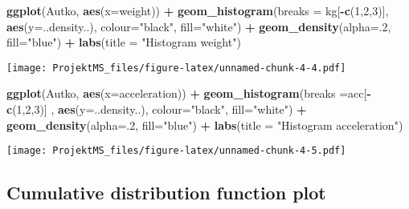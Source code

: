 \documentclass[
]{article}
\newenvironment{Shaded}{\begin{snugshade}}{\end{snugshade}}
\newcommand{\DataTypeTok}[1]{\textcolor[rgb]{0.13,0.29,0.53}{#1}}
\newcommand{\DecValTok}[1]{\textcolor[rgb]{0.00,0.00,0.81}{#1}}
\newcommand{\KeywordTok}[1]{\textcolor[rgb]{0.13,0.29,0.53}{\textbf{#1}}}
\newcommand{\NormalTok}[1]{#1}
\newcommand{\OperatorTok}[1]{\textcolor[rgb]{0.81,0.36,0.00}{\textbf{#1}}}
\newcommand{\StringTok}[1]{\textcolor[rgb]{0.31,0.60,0.02}{#1}}
\begin{document}
\begin{Shaded}
\begin{Highlighting}[]
\KeywordTok{ggplot}\NormalTok{(Autko, }\KeywordTok{aes}\NormalTok{(}\DataTypeTok{x=}\NormalTok{weight)) }\OperatorTok{+}\StringTok{ }\KeywordTok{geom_histogram}\NormalTok{(}\DataTypeTok{breaks =}\NormalTok{ kg[}\OperatorTok{-}\KeywordTok{c}\NormalTok{(}\DecValTok{1}\NormalTok{,}\DecValTok{2}\NormalTok{,}\DecValTok{3}\NormalTok{)], }\KeywordTok{aes}\NormalTok{(}\DataTypeTok{y=}\NormalTok{..density..),  }\DataTypeTok{colour=}\StringTok{"black"}\NormalTok{, }\DataTypeTok{fill=}\StringTok{"white"}\NormalTok{) }\OperatorTok{+}\StringTok{ }\KeywordTok{geom_density}\NormalTok{(}\DataTypeTok{alpha=}\NormalTok{.}\DecValTok{2}\NormalTok{, }\DataTypeTok{fill=}\StringTok{"blue"}\NormalTok{) }\OperatorTok{+}\StringTok{ }\KeywordTok{labs}\NormalTok{(}\DataTypeTok{title =} \StringTok{"Histogram weight"}\NormalTok{)}
\end{Highlighting}
\end{Shaded}

\texttt{[image: ProjektMS\_files/figure-latex/unnamed-chunk-4-4.pdf]}

\begin{Shaded}
\begin{Highlighting}[]
\KeywordTok{ggplot}\NormalTok{(Autko, }\KeywordTok{aes}\NormalTok{(}\DataTypeTok{x=}\NormalTok{acceleration)) }\OperatorTok{+}\StringTok{ }\KeywordTok{geom_histogram}\NormalTok{(}\DataTypeTok{breaks =}\NormalTok{acc[}\OperatorTok{-}\KeywordTok{c}\NormalTok{(}\DecValTok{1}\NormalTok{,}\DecValTok{2}\NormalTok{,}\DecValTok{3}\NormalTok{)]   , }\KeywordTok{aes}\NormalTok{(}\DataTypeTok{y=}\NormalTok{..density..),  }\DataTypeTok{colour=}\StringTok{"black"}\NormalTok{, }\DataTypeTok{fill=}\StringTok{"white"}\NormalTok{) }\OperatorTok{+}\StringTok{ }\KeywordTok{geom_density}\NormalTok{(}\DataTypeTok{alpha=}\NormalTok{.}\DecValTok{2}\NormalTok{, }\DataTypeTok{fill=}\StringTok{"blue"}\NormalTok{) }\OperatorTok{+}\StringTok{ }\KeywordTok{labs}\NormalTok{(}\DataTypeTok{title =} \StringTok{"Histogram acceleration"}\NormalTok{)}
\end{Highlighting}
\end{Shaded}

\texttt{[image: ProjektMS\_files/figure-latex/unnamed-chunk-4-5.pdf]}

\hypertarget{cumulative-distribution-function-plot}{%
\subsection{Cumulative distribution function
plot}\label{cumulative-distribution-function-plot}}
\end{document}
